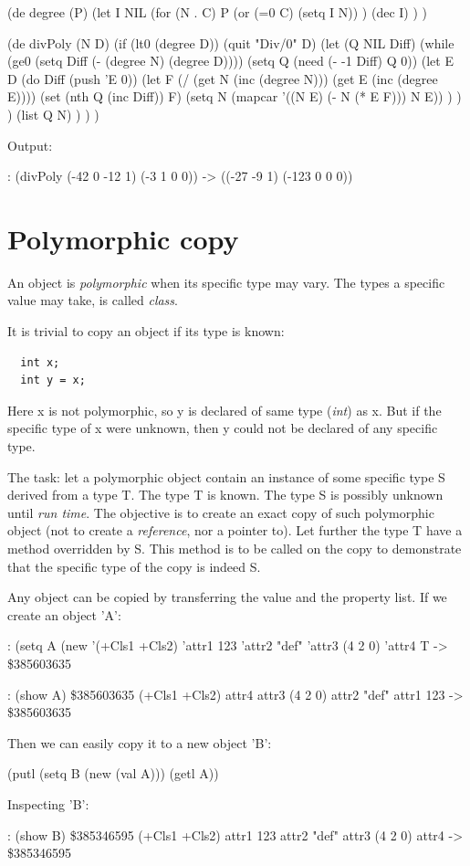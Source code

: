 \begin{wideverbatim}

(de degree (P)
   (let I NIL
      (for (N . C) P
         (or (=0 C) (setq I N)) )
      (dec I) ) )

(de divPoly (N D)
   (if (lt0 (degree D))
      (quit "Div/0" D)
      (let (Q NIL Diff)
         (while (ge0 (setq Diff (- (degree N) (degree D))))
            (setq Q (need (- -1 Diff) Q 0))
            (let E D
               (do Diff (push 'E 0))
               (let F (/ (get N (inc (degree N))) (get E (inc (degree E))))
                  (set (nth Q (inc Diff)) F)
                  (setq N (mapcar '((N E) (- N (* E F))) N E)) ) ) )
         (list Q N) ) ) )

Output:

: (divPoly (-42 0 -12 1) (-3 1 0 0))
-> ((-27 -9 1) (-123 0 0 0))

\end{wideverbatim}

\pagebreak{}
\section*{Polymorphic copy}


An object is \emph{polymorphic} when its specific
type may vary. The types a specific value may take, is called
\emph{class}.

It is trivial to copy an object if its type is known:

\begin{verbatim}
  int x;
  int y = x;
\end{verbatim}

Here x is not polymorphic, so y is declared of same type (\emph{int}) as
x. But if the specific type of x were unknown, then y could not be
declared of any specific type.

The task: let a polymorphic object contain an instance of some specific
type S derived from a type T. The type T is known. The type S is
possibly unknown until \emph{run time}. The objective
is to create an exact copy of such polymorphic object (not to create a
\emph{reference}, nor a pointer to). Let further the
type T have a method overridden by S. This method is to be called on the
copy to demonstrate that the specific type of the copy is indeed S.

\begin{wideverbatim}

Any object can be copied by transferring the value and the property list. If we
create an object 'A':

: (setq A (new '(+Cls1 +Cls2) 'attr1 123  'attr2 "def"  'attr3 (4 2 0)  'attr4 T
-> \$385603635

: (show A)
\$385603635 (+Cls1 +Cls2)
   attr4
   attr3 (4 2 0)
   attr2 "def"
   attr1 123
-> \$385603635

Then we can easily copy it to a new object 'B':

(putl (setq B (new (val A))) (getl A))

Inspecting 'B':

: (show B)
\$385346595 (+Cls1 +Cls2)
   attr1 123
   attr2 "def"
   attr3 (4 2 0)
   attr4
-> \$385346595

\end{wideverbatim}

